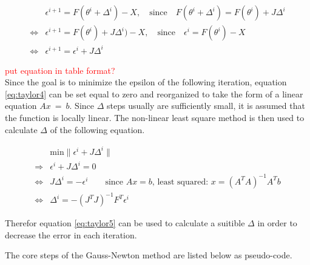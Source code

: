 \begin{align}
	& \epsilon^{i+1} = F(\theta^{i} + \Delta^{i}) - X, \quad \text{since} \quad F(\theta^{i} + \Delta^{i}) = F(\theta^{i}) + J \Delta^{i} \\
	\Leftrightarrow & \epsilon^{i+1} = F(\theta^{i}) + J \Delta^{i}) - X, \quad \text{since} \quad \epsilon^{i} = F(\theta^{i}) - X \\
	\Leftrightarrow & \epsilon^{i+1} = \epsilon^{i} + J \Delta^{i} \label{eq:taylor4}
\end{align}

\textcolor{red}{put equation in table format?}\\
Since the goal is to minimize the epsilon of the following iteration, equation \ref*{eq:taylor4} can be set equal to zero and reorganized to
take the form of a linear equation $Ax~=~b$. Since $\Delta$ steps usually are sufficiently small, it is assumed that the function is locally
linear. The non-linear least square method is then used to calculate $\Delta$ of the following equation.

\begin{align}
	&\text{min} \| \epsilon^{i} + J \Delta^{i} \| \\
	\Rightarrow & \epsilon^{i} + J \Delta^{i} = 0 \\
	\Leftrightarrow & J \Delta^{i} = -\epsilon^{i} \qquad \text{since $Ax = b$, least squared: } x = (A^T A)^{-1} A^T b \\
	\Leftrightarrow & \Delta^{i} = - (J^T J)^{-1} F^T \epsilon^{i} \label{eq:taylor5}
\end{align}

Therefor equation \ref*{eq:taylor5} can be used to calculate a suitible $\Delta$ in order to decrease the error in each iteration. \newline

The core steps of the Gauss-Newton method are listed below as pseudo-code.



